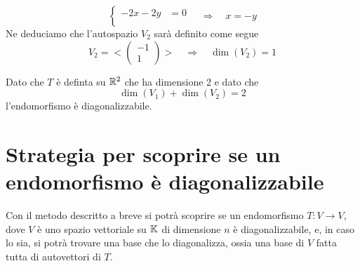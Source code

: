 \begin{example}
\begin{itemize}
\[			      \begin{cases}
				      -2x - 2y & = 0 \\
			      \end{cases} \quad \Rightarrow \quad
			      x = -y
		      \]
		      Ne deduciamo che l'autospazio $V_2$ sarà definito come segue
		      \[
			      V_2 = < \begin{pmatrix} -1 \\ 1 \end{pmatrix} > \quad \Rightarrow \quad
			      \dim(V_2) = 1
		      \]
	\end{itemize}
	Dato che $T$ è definta su $\mathbb{R}^2$ che ha dimensione 2 e dato che
	\[ \dim(V_1) + \dim(V_2) = 2 \] l'endomorfismo è diagonalizzabile.
\end{example}


\section{Strategia per scoprire se un endomorfismo è diagonalizzabile}
Con il metodo descritto a breve si potrà scoprire se un endomorfismo
$T : V \to V$, dove $V$ è uno spazio vettoriale su $\mathbb{K}$ di dimensione $n$
è diagonalizzabile, e, in caso lo sia, si potrà trovare una base che lo diagonalizza,
ossia una base di $V$ fatta tutta di autovettori di $T$.

